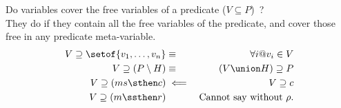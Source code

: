 Do variables cover the free variables of a predicate ($V \subseteq P$)~?
\\They do if they contain all the free variables of the predicate,
and cover those free in any predicate meta-variable.
\begin{eqnarray*}
  V \supseteq \setof{v_1,\ldots,v_n} &\equiv& \forall i @ v_i \in V
\\ V \supseteq ( P \setminus H ) &\equiv& (V\union H) \supseteq P
\\ V \supseteq (ms \sthen c) &\impliedby& V \supseteq c
\\ V \supseteq (m \ssthen r) && \textrm{Cannot say without } \rho.
\end{eqnarray*} 